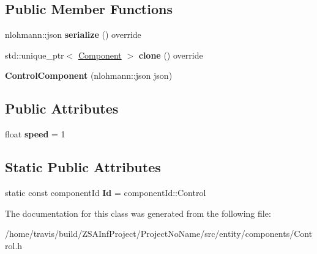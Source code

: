 \subsection*{Public Member Functions}
\begin{DoxyCompactItemize}
\item 
\hypertarget{classControlComponent_a4c79cd76da08ba339ab9238a1e5bb016}{nlohmann\-::json {\bfseries serialize} () override}\label{classControlComponent_a4c79cd76da08ba339ab9238a1e5bb016}

\item 
\hypertarget{classControlComponent_aaf2eb2415f762178bbcbf673c7cdfa1c}{std\-::unique\-\_\-ptr$<$ \hyperlink{classComponent}{Component} $>$ {\bfseries clone} () override}\label{classControlComponent_aaf2eb2415f762178bbcbf673c7cdfa1c}

\item 
\hypertarget{classControlComponent_a84410c1ccb6e7b1581a099c0b72fc2dd}{{\bfseries Control\-Component} (nlohmann\-::json json)}\label{classControlComponent_a84410c1ccb6e7b1581a099c0b72fc2dd}

\end{DoxyCompactItemize}
\subsection*{Public Attributes}
\begin{DoxyCompactItemize}
\item 
\hypertarget{classControlComponent_a22dc0dc5b37b679770150a5b2a9ba96e}{float {\bfseries speed} = 1}\label{classControlComponent_a22dc0dc5b37b679770150a5b2a9ba96e}

\end{DoxyCompactItemize}
\subsection*{Static Public Attributes}
\begin{DoxyCompactItemize}
\item 
\hypertarget{classControlComponent_a1a98a2363b43b0c7022474bcca912ce0}{static const component\-Id {\bfseries Id} = component\-Id\-::\-Control}\label{classControlComponent_a1a98a2363b43b0c7022474bcca912ce0}

\end{DoxyCompactItemize}


The documentation for this class was generated from the following file\-:\begin{DoxyCompactItemize}
\item 
/home/travis/build/\-Z\-S\-A\-Inf\-Project/\-Project\-No\-Name/src/entity/components/Control.\-h\end{DoxyCompactItemize}
